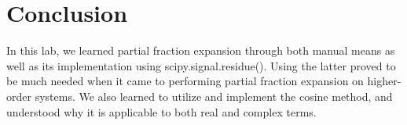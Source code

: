 \documentclass[11pt,a4,titlepage]{article}
\begin{document}
\section{Conclusion}
In this lab, we learned partial fraction expansion through both manual means as well as its implementation using scipy.signal.residue(). Using the latter proved to be much needed when it came to performing partial fraction expansion on higher-order systems. We also learned to utilize and implement the cosine method, and understood why it is applicable to both real and complex terms.
\end{document}
